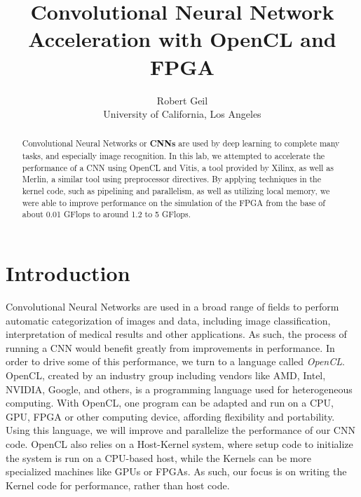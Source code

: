 \documentclass[letterpaper,twocolumn,10pt]{article}
\begin{document}

\date{}

\title{\Large \bf Convolutional Neural Network Acceleration with OpenCL
and FPGA}

\author{
{\rm Robert Geil}\\
University of California, Los Angeles
} %

\maketitle

\begin{abstract}
Convolutional Neural Networks or \textbf{CNNs} are used by deep learning to
complete many tasks, and especially image recognition. In this lab, we 
attempted to accelerate the performance of a CNN using OpenCL and Vitis, a tool
provided by Xilinx, as well as Merlin, a similar tool using preprocessor
directives. By applying techniques in the kernel code, such as pipelining and
parallelism, as well as utilizing local memory, we were able to improve
performance on the simulation of the FPGA from the base of about 0.01 GFlops
to around 1.2 to 5 GFlops.
\end{abstract}

\section{Introduction}

Convolutional Neural Networks are used in a broad range of fields to perform
automatic categorization of images and data, including image classification,
interpretation of medical results and other applications. As such, the process
of running a CNN would benefit greatly from improvements in performance. In
order to drive some of this performance, we turn to a language called
\textit{OpenCL}. OpenCL, created by an industry group including vendors like
AMD, Intel, NVIDIA, Google, and others, is a programming language used for
heterogeneous computing. With OpenCL, one program can be adapted and run on a
CPU, GPU, FPGA or other computing device, affording flexibility and
portability. Using this language, we will improve and parallelize the
performance of our CNN code. OpenCL also relies on a Host-Kernel system, where
setup code to initialize the system is run on a CPU-based host, while the
Kernels can be more specialized machines like GPUs or FPGAs. As such, our focus
is on writing the Kernel code for performance, rather than host code.
\end{document}
